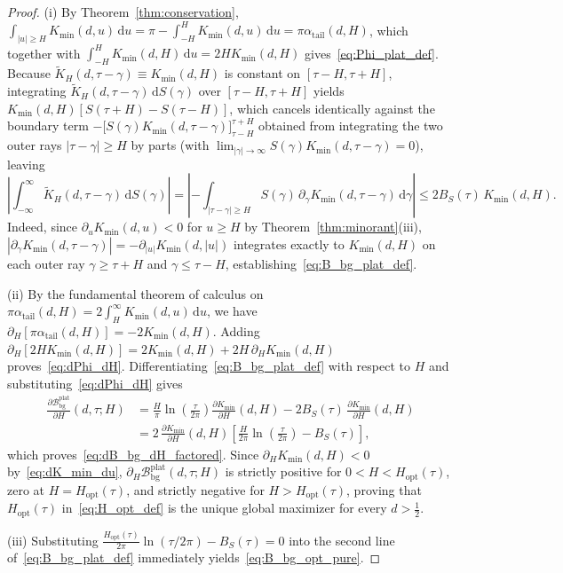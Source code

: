 \documentclass[11pt,reqno]{amsart}
\theoremstyle{definition}
\theoremstyle{remark}
\numberwithin{equation}{section}
\newcommand{\dd}{\mathrm{d}}
\begin{document}
\begin{proof}
(i) By Theorem~\ref{thm:conservation}, $\int_{|u| \ge H} K_{\min}(d,u)\,\dd u = \pi - \int_{-H}^H K_{\min}(d,u)\,\dd u = \pi\alpha_{\mathrm{tail}}(d,H)$, which together with $\int_{-H}^H K_{\min}(d,H)\,\dd u = 2H K_{\min}(d,H)$ gives~\eqref{eq:Phi_plat_def}. Because $\widetilde{K}_H(d, \tau - \gamma) \equiv K_{\min}(d,H)$ is constant on $[\tau - H, \tau + H]$, integrating $\widetilde{K}_H(d, \tau - \gamma)\,\dd S(\gamma)$ over $[\tau - H, \tau + H]$ yields $K_{\min}(d,H)[S(\tau + H) - S(\tau - H)]$, which cancels identically against the boundary term $-\bigl[S(\gamma)K_{\min}(d, \tau - \gamma)\bigr]_{\tau - H}^{\tau + H}$ obtained from integrating the two outer rays $|\tau - \gamma| \ge H$ by parts (with $\lim_{|\gamma|\to\infty} S(\gamma)K_{\min}(d, \tau - \gamma) = 0$), leaving
\[
\left|\int_{-\infty}^{\infty} \widetilde{K}_H(d, \tau - \gamma)\,\dd S(\gamma)\right| = \left|-\int_{|\tau - \gamma| \ge H} S(\gamma)\,\partial_\gamma K_{\min}(d, \tau - \gamma)\,\dd\gamma\right| \le 2B_S(\tau)\,K_{\min}(d,H).
\]
Indeed, since $\partial_u K_{\min}(d,u) < 0$ for $u \ge H$ by Theorem~\ref{thm:minorant}(iii), $|\partial_\gamma K_{\min}(d, \tau - \gamma)| = -\partial_{|u|} K_{\min}(d, |u|)$ integrates exactly to $K_{\min}(d,H)$ on each outer ray $\gamma \ge \tau + H$ and $\gamma \le \tau - H$, establishing~\eqref{eq:B_bg_plat_def}.

(ii) By the fundamental theorem of calculus on $\pi\alpha_{\mathrm{tail}}(d,H) = 2\int_H^{\infty} K_{\min}(d,u)\,\dd u$, we have $\partial_H[\pi\alpha_{\mathrm{tail}}(d,H)] = -2K_{\min}(d,H)$. Adding $\partial_H[2H K_{\min}(d,H)] = 2K_{\min}(d,H) + 2H\,\partial_H K_{\min}(d,H)$ proves~\eqref{eq:dPhi_dH}. Differentiating~\eqref{eq:B_bg_plat_def} with respect to $H$ and substituting~\eqref{eq:dPhi_dH} gives
\[
\begin{aligned}
\frac{\partial\mathcal{B}_{\mathrm{bg}}^{\mathrm{plat}}}{\partial H}(d,\tau;H) &= \frac{H}{\pi}\ln\!\left(\frac{\tau}{2\pi}\right)\frac{\partial K_{\min}}{\partial H}(d,H) - 2B_S(\tau)\,\frac{\partial K_{\min}}{\partial H}(d,H) \\
&= 2\,\frac{\partial K_{\min}}{\partial H}(d,H)\left[\frac{H}{2\pi}\ln\!\left(\frac{\tau}{2\pi}\right) - B_S(\tau)\right],
\end{aligned}
\]
which proves~\eqref{eq:dB_bg_dH_factored}. Since $\partial_H K_{\min}(d,H) < 0$ by~\eqref{eq:dK_min_du}, $\partial_H \mathcal{B}_{\mathrm{bg}}^{\mathrm{plat}}(d,\tau;H)$ is strictly positive for $0 < H < H_{\mathrm{opt}}(\tau)$, zero at $H = H_{\mathrm{opt}}(\tau)$, and strictly negative for $H > H_{\mathrm{opt}}(\tau)$, proving that $H_{\mathrm{opt}}(\tau)$ in~\eqref{eq:H_opt_def} is the unique global maximizer for every $d > \frac{1}{2}$.

(iii) Substituting $\frac{H_{\mathrm{opt}}(\tau)}{2\pi}\ln(\tau/2\pi) - B_S(\tau) = 0$ into the second line of~\eqref{eq:B_bg_plat_def} immediately yields~\eqref{eq:B_bg_opt_pure}.
\end{proof}
\end{document}
